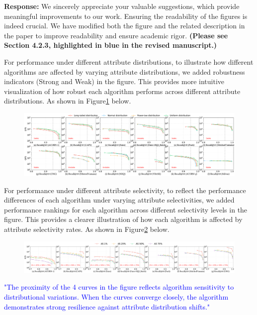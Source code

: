 \documentclass[sigconf, nonacm]{acmart}
\begin{document}
\noindent
\textbf{Response:} We sincerely appreciate your valuable suggestions, which provide meaningful improvements to our work. Ensuring the readability of the figures is indeed crucial. We have modified both the figure and the related description in the paper to improve readability and ensure academic rigor. \textbf{(Please see Section 4.2.3, highlighted in blue in the revised manuscript.)}

For performance under different attribute distributions, to illustrate how different algorithms are affected by varying attribute distributions, we added robustness indicators (Strong and Weak) in the figure. This provides more intuitive visualization of how robust each algorithm performs across different attribute distributions. As shown in Figure\ref{fig:attribute_distribution} below.

\begin{figure}[htbp]
	\centering
	\includegraphics[width=\linewidth]{fig/exp_3_1.pdf}
	\caption{}
	\label{fig:attribute_distribution}
\end{figure}

For performance under different attribute selectivity, to reflect the performance differences of each algorithm under varying attribute selectivities, we added performance rankings for each algorithm across different selectivity levels in the figure. This provides a clearer illustration of how each algorithm is affected by attribute selectivity rates. As shown in Figure\ref{fig:attribute_selectivity} below.

\begin{figure}[htbp]
	\centering
	\includegraphics[width=\linewidth]{fig/exp_5_2_1.pdf}
	\caption{}
	\label{fig:attribute_selectivity}
\end{figure}

\textcolor{blue}{"The proximity of the 4 curves in the figure reflects algorithm sensitivity to distributional variations. When the curves converge closely, the algorithm demonstrates strong resilience against attribute distribution shifts."}
\end{document}
